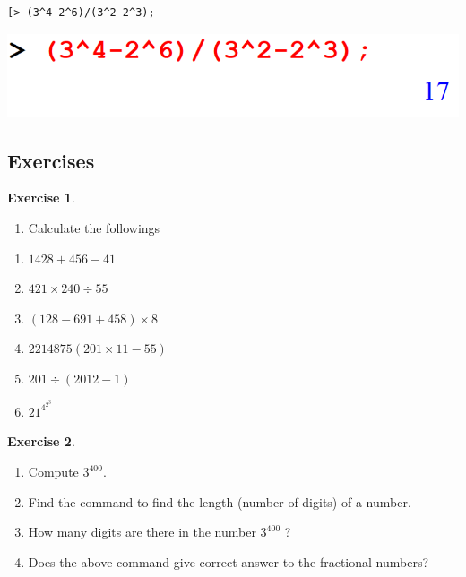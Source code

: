 \documentclass[
]{book}
\providecommand{\tightlist}{%
  \setlength{\itemsep}{0pt}\setlength{\parskip}{0pt}}
\theoremstyle{definition}
\theoremstyle{definition}
\theoremstyle{definition}
\newtheorem{exercise}{Exercise}[chapter]
\theoremstyle{definition}
\theoremstyle{remark}
\begin{document}
\begin{verbatim}
[> (3^4-2^6)/(3^2-2^3);
\end{verbatim}

\includegraphics{figures/Lesson 1/fig16.png}

\subsection{Exercises}\label{exercises}

\begin{exercise}
\protect\hypertarget{exr:unnamed-chunk-2}{}\label{exr:unnamed-chunk-2}\leavevmode

\begin{enumerate}
\def\labelenumi{\arabic{enumi}.}
\tightlist
\item
  Calculate the followings
\end{enumerate}

\begin{enumerate}
\def\labelenumi{\roman{enumi}.}
\tightlist
\item
  \(1428 + 456 − 41\)
\item
  \(421 × 240 ÷ 55\)
\item
  \((128 − 691 + 458) × 8\)
\item
  \(2214875(201 × 11 − 55)\)
\item
  \(201 ÷ (2012 − 1)\)
\item
  \(21^{4^{2^3}}\)
\end{enumerate}

\end{exercise}

\begin{exercise}
\protect\hypertarget{exr:unnamed-chunk-3}{}\label{exr:unnamed-chunk-3}\leavevmode

\begin{enumerate}
\def\labelenumi{\roman{enumi}.}
\tightlist
\item
  Compute \(3^{400}\).
\item
  Find the command to find the length (number of digits) of a number.
\item
  How many digits are there in the number \(3^{400}\) ?
\item
  Does the above command give correct answer to the fractional numbers?
\end{enumerate}

\end{exercise}
\end{document}
